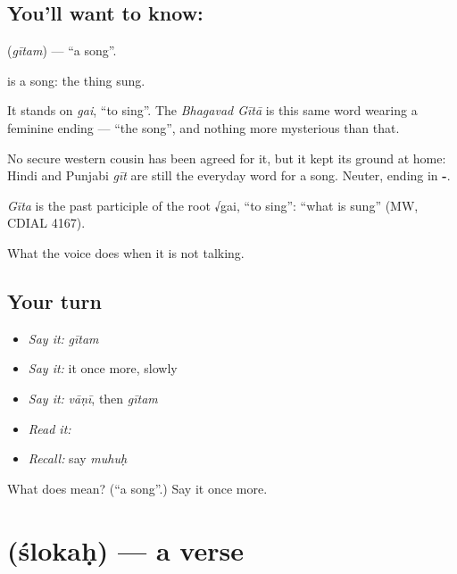 \subsection*{You'll want to know: }
\textbf{} (\emph{gītam}) — \textquotedblleft{}a song\textquotedblright{}.

\textbf{} is a song: the thing sung.

It stands on \emph{gai}, \textquotedblleft{}to sing\textquotedblright{}. The \emph{Bhagavad Gītā} is this same word wearing a feminine ending — \textquotedblleft{}the song\textquotedblright{}, and nothing more mysterious than that.

No secure western cousin has been agreed for it, but it kept its ground at home: Hindi and Punjabi \emph{gīt} are still the everyday word for a song. Neuter, ending in \textbf{-}.

\begin{cousinweb}
\emph{Gīta} is the past participle of the root √gai, \textquotedblleft{}to sing\textquotedblright{}: \textquotedblleft{}what is sung\textquotedblright{} (MW, CDIAL 4167).
\end{cousinweb}

\begin{grammarlens}[title={What you've built}]
What the voice does when it is not talking.
\end{grammarlens}

\subsection*{Your turn}
\begin{itemize}
\raggedright
  \item \emph{Say it:} \emph{gītam}
  \item \emph{Say it:} it once more, slowly
  \item \emph{Say it:} \emph{vāṇī}, then \emph{gītam}
  \item \emph{Read it:} \textbf{}
  \item \emph{Recall:} say \emph{muhuḥ}
\end{itemize}

\begin{tcolorbox}[breakable,colback=teal!4,colframe=teal!35!black,title={Before you move on}]
What does  mean? (\textquotedblleft{}a song\textquotedblright{}.) Say it once more.
\end{tcolorbox}
\section[\texorpdfstring{\sk{श्लोकः} (ślokaḥ)}{श्लोकः (ślokaḥ)}]{ (ślokaḥ) — a verse}

